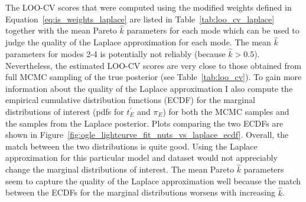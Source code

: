 \documentclass[12pt,dvipsnames]{report}
\begin{document}
The LOO-CV scores that were computed using the modified weights defined in 
Equation~\ref{eq:is_weights_laplace} are listed in Table~\ref{tab:loo_cv_laplace} 
together with the mean Pareto $\hat k$ parameters for each mode which can be used 
to judge the quality of the Laplace approximation for each mode. The mean 
$\hat k$ parameters for modes 2-4 is potentially not reliably (because $\hat k>0.5$).
Nevertheless, the estimated LOO-CV scores are 
very close to those obtained from full MCMC sampling of the true posterior 
(see Table~\ref{tab:loo_cv}). To gain more information about the quality of the Laplace 
approximation I also compute the empirical cumulative distribution functions (ECDF)
for the marginal distributions of interest (pdfs for $t_E^\prime$ 
and $\pi_E$) for both the MCMC samples and the samples from the Laplace posterior.
Plots comparing the two ECDFs are shown in 
Figure~\ref{fig:ogle_lightcurve_fit_nuts_vs_laplace_ecdf}. Overall, the match between 
the two distributions is quite good. Using the Laplace approximation 
for this particular model and dataset would not appreciably change the marginal 
distributions of interest. 
The mean Pareto $\hat k$ parameters seem to capture the quality of the Laplace 
approximation well because the match between the ECDFs
for the marginal distributions worsens with increasing $\hat k$.
\end{document}
